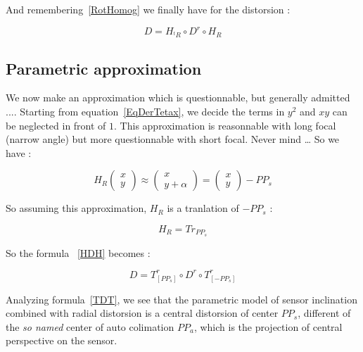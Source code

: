 And remembering~\ref{RotHomog} we finally have for the distorsion :

\begin{equation}
	D = H_{^tR} \circ  D^r \circ   H_{R} \label{HDH}
\end{equation}


\subsection{Parametric approximation}

We now make an approximation which is questionnable, but generally admitted ....
Starting from equation~\ref{EqDerTetax}, we decide the terms in $y^2$
and $xy$ can be neglected in front of $1$.  This approximation is reasonnable
with long focal (narrow angle) but more questionnable with short focal.  Never mind \dots
So we have :


\begin{equation}
	H_{R}\begin{pmatrix} x \\ y \end{pmatrix}  \approx \begin{pmatrix} x \\ y  +\alpha \end{pmatrix}
		= \begin{pmatrix} x \\ y  \end{pmatrix} - PP_s
\end{equation}

So assuming this approximation,  $H_{R}$ is a tranlation of $ - PP_s$ :

\begin{equation}
	H_{R} = Tr_{PP_s}
\end{equation}

So the formula ~\ref{HDH} becomes :

\begin{equation}
	D =    T^r_{[PP_s]}  \circ  D^r \circ  T^r_{[-PP_s]} \label{TDT}
\end{equation}

Analyzing formula~\ref{TDT}, we see
that the parametric model of sensor inclination  combined with radial distorsion
is a central distorsion of center $PP_s$, different of the \emph{so named}
center of auto colimation $PP_a$, which is the projection of central perspective on the sensor.


